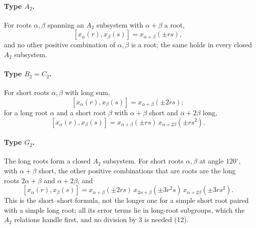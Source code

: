 \documentclass[11pt,oneside]{article}
\numberwithin{equation}{section}
\theoremstyle{definition}
\theoremstyle{remark}
\begin{document}
\paragraph{Type $A_2$.} For roots $\alpha,\beta$ spanning an $A_2$ subsystem
with $\alpha+\beta$ a root,
\begin{equation}\label{ogl:ch:eq:A2}
 [x_\alpha(r),x_\beta(s)]=x_{\alpha+\beta}(\pm rs),
\end{equation}
and no other positive combination of $\alpha,\beta$ is a root; the same holds in
every closed $A_2$ subsystem.

\paragraph{Type $B_2=C_2$.} For short roots $\alpha,\beta$ with long sum,
\begin{equation}\label{ogl:ch:eq:B2long}
 [x_\alpha(r),x_\beta(s)]=x_{\alpha+\beta}(\pm2rs);
\end{equation}
for a long root $\alpha$ and a short root $\beta$ with $\alpha+\beta$ short and
$\alpha+2\beta$ long,
\begin{equation}\label{ogl:ch:eq:B2short}
 [x_\alpha(r),x_\beta(s)]=x_{\alpha+\beta}(\pm rs)\,x_{\alpha+2\beta}(\pm rs^2).
\end{equation}

\paragraph{Type $G_2$.} The long roots form a closed $A_2$ subsystem. For short
roots $\alpha,\beta$ at angle $120^\circ$, with $\alpha+\beta$ short, the other
positive combinations that are roots are the long roots $2\alpha+\beta$ and
$\alpha+2\beta$, and
\begin{equation}\label{ogl:ch:eq:G2}
 [x_\alpha(r),x_\beta(s)]
 =x_{\alpha+\beta}(\pm2rs)\,x_{2\alpha+\beta}(\pm3r^2s)\,x_{\alpha+2\beta}(\pm3rs^2).
\end{equation}
This is the short--short formula, not the longer one for a simple short root
paired with a simple long root; all its error terms lie in long-root subgroups,
which the $A_2$ relations handle first, and no division by $3$ is needed (12).
\end{document}
